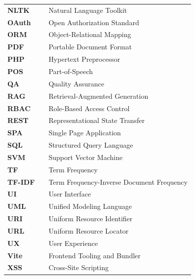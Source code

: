 \begin{flushleft}
\begin{tabular}{l p{0.78\linewidth}}
\textbf{NLTK}  & Natural Language Toolkit\\
\textbf{OAuth} & Open Authorization Standard\\
\textbf{ORM}   & Object-Relational Mapping\\
\textbf{PDF}   & Portable Document Format\\
\textbf{PHP}   & Hypertext Preprocessor\\
\textbf{POS}   & Part-of-Speech\\
\textbf{QA}    & Quality Assurance\\
\textbf{RAG}   & Retrieval-Augmented Generation\\
\textbf{RBAC}  & Role-Based Access Control\\
\textbf{REST}  & Representational State Transfer\\
\textbf{SPA}   & Single Page Application\\
\textbf{SQL}   & Structured Query Language\\
\textbf{SVM}   & Support Vector Machine\\
\textbf{TF}    & Term Frequency\\
\textbf{TF-IDF}& Term Frequency-Inverse Document Frequency\\
\textbf{UI}    & User Interface\\
\textbf{UML}   & Unified Modeling Language\\
\textbf{URI}   & Uniform Resource Identifier\\
\textbf{URL}   & Uniform Resource Locator\\
\textbf{UX}    & User Experience\\
\textbf{Vite}  & Frontend Tooling and Bundler\\
\textbf{XSS}   & Cross-Site Scripting\\
\end{tabular}
\end{flushleft}
